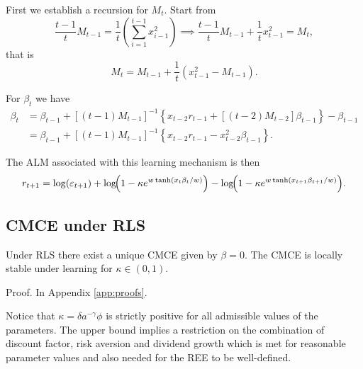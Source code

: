 \documentclass[11pt]{article}
\begin{document}
First we establish a recursion for $M_t$. Start from 
\begin{equation}
\frac{t-1}{t} M_{t-1} = \frac{1}{t}  \left(\sum^{t-1}_{i=1}  x_{i-1}^2 \right) \implies \frac{t-1}{t} M_{t-1} + \frac{1}{t} x_{t-1}^2 = M_t,
\end{equation}
that is
\begin{equation}
    M_t = M_{t-1} + \frac{1}{t} \left(x_{t-1}^2 - M_{t-1} \right).
\end{equation}

For $\beta_t$ we have
\begin{equation}\label{eq:b_t_evolution}
    \begin{aligned}
        \beta_t & = \beta_{t-1} + \left[(t-1) M_{t-1} \right]^{-1} \left\{ x_{t-2} r_{t-1} + \left[(t-2) M_{t-2} \right] \beta_{t-1} \right\} - \beta_{t-1} \\
        & = \beta_{t-1} + \left[(t-1) M_{t-1} \right]^{-1} \left\{ x_{t-2} r_{t-1} - x_{t-2}^2 \beta_{t-1} \right\}.
    \end{aligned}
\end{equation}

The ALM associated with this learning mechanism is then
\begin{equation}\label{eq:alm_RLS}
    r_{t+1} = \log(\varepsilon_{t+1})
    + \log\!\Bigl(1 - \kappa e^{w \tanh(x_t \beta_t / w)}\Bigr)
    - \log\!\Bigl(1 - \kappa e^{w \tanh(x_{t+1} \beta_{t+1} / w)}\Bigr).
\end{equation}

\subsection{CMCE under RLS}
\begin{proposition}\label{prop:RLS}
    Under RLS there exist a unique CMCE given by $\beta = 0$.
    The CMCE is locally stable under learning for $\kappa \in (0,1)$.
\end{proposition}

Proof. In Appendix \ref{app:proofs}.

Notice that $\kappa = \delta a^{- \gamma} \phi$ is strictly positive for all admissible values of the parameters.
The upper bound implies a restriction on the combination of discount factor, risk aversion and dividend growth which is met for reasonable parameter values and also needed for the REE to be well-defined.



\end{document}
